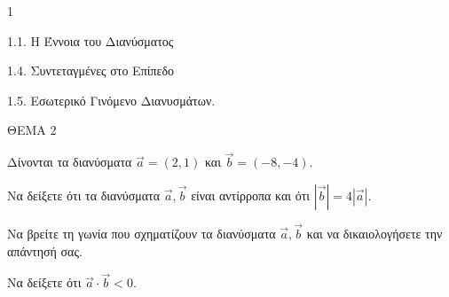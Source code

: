\begin{ylh}{1}
    \item 1.1. Η Έννοια του Διανύσματος
    \item 1.4. Συντεταγμένες στο Επίπεδο
    \item 1.5. Εσωτερικό Γινόμενο Διανυσμάτων.
\end{ylh}
ΘΕΜΑ 2

Δίνονται τα διανύσματα $\vec{a} = (2, 1)$ και $\vec{b} = (-8, -4)$.

\begin{alist}
\item Να δείξετε ότι τα διανύσματα $\vec{a}, \vec{b}$ είναι αντίρροπα και ότι $|\vec{b}| = 4|\vec{a}|$. 
\item Να βρείτε τη γωνία που σχηματίζουν τα διανύσματα $\vec{a}, \vec{b}$ και να δικαιολογήσετε την απάντησή σας. 
\item Να δείξετε ότι $\vec{a} \cdot \vec{b} < 0$. 
\end{alist}